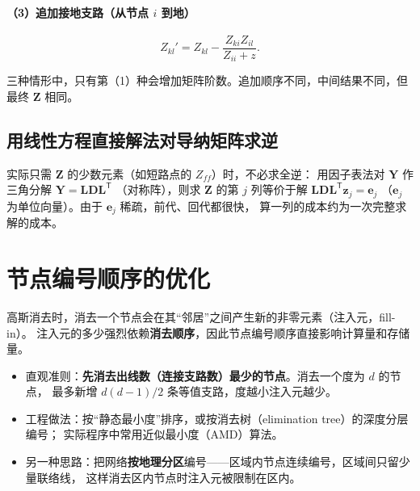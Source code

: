 \paragraph{（3）追加接地支路（从节点 $i$ 到地）}
\begin{equation}
  Z_{kl}'=Z_{kl}-\frac{Z_{ki}Z_{il}}{Z_{ii}+z}.
\end{equation}

三种情形中，只有第（1）种会增加矩阵阶数。追加顺序不同，中间结果不同，但最终 $\boldsymbol Z$ 相同。

\subsection{用线性方程直接解法对导纳矩阵求逆}

实际只需 $\boldsymbol Z$ 的少数元素（如短路点的 $Z_{ff}$）时，不必求全逆：
用因子表法对 $\boldsymbol Y$ 作三角分解 $\boldsymbol Y=\boldsymbol L\boldsymbol D\boldsymbol L^{\mathsf T}$
（对称阵），则求 $\boldsymbol Z$ 的第 $j$ 列等价于解
$\boldsymbol L\boldsymbol D\boldsymbol L^{\mathsf T}\boldsymbol z_j=\boldsymbol e_j$
（$\boldsymbol e_j$ 为单位向量）。由于 $\boldsymbol e_j$ 稀疏，前代、回代都很快，
算一列的成本约为一次完整求解的成本。


\section{节点编号顺序的优化}

高斯消去时，消去一个节点会在其“邻居”之间产生新的非零元素（注入元，fill-in）。
注入元的多少强烈依赖\textbf{消去顺序}，因此节点编号顺序直接影响计算量和存储量。

\begin{itemize}
  \item 直观准则：\textbf{先消去出线数（连接支路数）最少的节点}。消去一个度为 $d$ 的节点，
        最多新增 $d(d-1)/2$ 条等值支路，度越小注入元越少。
  \item 工程做法：按“静态最小度”排序，或按消去树（elimination tree）的深度分层编号；
        实际程序中常用近似最小度（AMD）算法。
  \item 另一种思路：把网络\textbf{按地理分区}编号——区域内节点连续编号，区域间只留少量联络线，
        这样消去区内节点时注入元被限制在区内。
\end{itemize}

